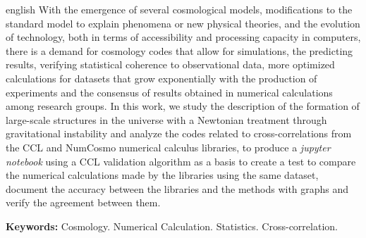 \documentclass[12pt,a4paper,oneside,brazil]{abntex2}
\theoremstyle{definition}
\numberwithin{defin}{section}
\numberwithin{thm}{section}
\numberwithin{notation}{section}
\theoremstyle{remark}
\numberwithin{exmp}{section}
\numberwithin{p}{section}
\numberwithin{lema}{section}
\begin{document}
	\begin{resumo}[Abstract]
		
		\begin{otherlanguage*}{english}
			With the emergence of several cosmological models, modifications to the standard model to explain phenomena or new physical theories, and the evolution of technology, both in terms of accessibility and processing capacity in computers, there is a demand for cosmology codes that allow for simulations, the predicting results, verifying statistical coherence to observational data, more optimized calculations for datasets that grow exponentially with the production of experiments and the consensus of results obtained in numerical calculations among research groups. In this work, we study the description of the formation of large-scale structures in the universe with a Newtonian treatment through gravitational instability and analyze the codes related to cross-correlations from the CCL and NumCosmo numerical calculus libraries, to produce a \textit{jupyter notebook} using a CCL validation algorithm as a basis to create a test to compare the numerical calculations made by the libraries using the same dataset, document the accuracy between the libraries and the methods with graphs and verify the agreement between them. 
			
			\textbf{Keywords:} Cosmology. Numerical Calculation. Statistics. Cross-correlation.
		\end{otherlanguage*}
		
	\end{resumo}
	
	
	\listoffigures*
	
	
	
	
	
	\cleardoublepage
	

	\tableofcontents*
	
	\cleardoublepage
	
	\textual
	\setcounter{page}{1}
	
	
	
	
	
		
	
	\postextual
	
	
	
\end{document}
